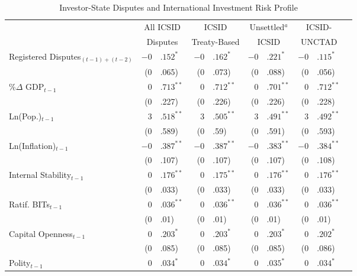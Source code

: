 \documentclass[12pt,onesided]{amsart}
\begin{document}
\begin{savenotes}
\begin{table}[ht]
\vspace{3cm}
\centering
\caption{Investor-State Disputes and International Investment Risk Profile}
\label{tab:dispRepLevel}
\begin{tabular}{lr@{} lr@{}lr@{}lr@{}lr@{}}
  \hline\hline
  & \multicolumn{2}{c}{All ICSID} & \multicolumn{2}{c}{ICSID} & \multicolumn{2}{c}{Unsettled$^{a}$} & \multicolumn{2}{c}{ICSID-} \\ 
  & \multicolumn{2}{c}{Disputes} & \multicolumn{2}{c}{Treaty-Based} & \multicolumn{2}{c}{ICSID} & \multicolumn{2}{c}{UNCTAD} \\
 \hline
Registered Disputes$_{(t-1) + (t-2)}$ & $-0$&$.152^{\ast}$ & $-0$&$.162^{\ast}$ & $-0$&$.221^{\ast}$ & $-0$&$.115^{\ast}$ \\ 
   & (0&.065) & (0&.073) & (0&.088) & (0&.056) \\ 
  \%$\Delta$ GDP$_{t-1}$ & $0$&$.713^{\ast\ast}$ & $0$&$.712^{\ast\ast}$ & $0$&$.701^{\ast\ast}$ & $0$&$.712^{\ast\ast}$ \\ 
   & (0&.227) & (0&.226) & (0&.226) & (0&.228) \\ 
  Ln(Pop.)$_{t-1}$ & $3$&$.518^{\ast\ast}$ & $3$&$.505^{\ast\ast}$ & $3$&$.491^{\ast\ast}$ & $3$&$.492^{\ast\ast}$ \\ 
   & (0&.589) & (0&.59) & (0&.591) & (0&.593) \\ 
  Ln(Inflation)$_{t-1}$ & $-0$&$.387^{\ast\ast}$ & $-0$&$.387^{\ast\ast}$ & $-0$&$.383^{\ast\ast}$ & $-0$&$.384^{\ast\ast}$ \\ 
   & (0&.107) & (0&.107) & (0&.107) & (0&.108) \\ 
  Internal Stability$_{t-1}$ & $0$&$.176^{\ast\ast}$ & $0$&$.175^{\ast\ast}$ & $0$&$.176^{\ast\ast}$ & $0$&$.176^{\ast\ast}$ \\ 
   & (0&.033) & (0&.033) & (0&.033) & (0&.033) \\ 
  Ratif. BITs$_{t-1}$ & $0$&$.036^{\ast\ast}$ & $0$&$.036^{\ast\ast}$ & $0$&$.036^{\ast\ast}$ & $0$&$.036^{\ast\ast}$ \\ 
   & (0&.01) & (0&.01) & (0&.01) & (0&.01) \\ 
  Capital Openness$_{t-1}$ & $0$&$.203^{\ast}$ & $0$&$.203^{\ast}$ & $0$&$.203^{\ast}$ & $0$&$.202^{\ast}$ \\ 
   & (0&.085) & (0&.085) & (0&.085) & (0&.086) \\ 
  Polity$_{t-1}$ & $0$&$.034^{\ast}$ & $0$&$.034^{\ast}$ & $0$&$.035^{\ast}$ & $0$&$.034^{\ast}$ \\ 

\end{tabular}
\end{table}
\end{savenotes}
\end{document}
